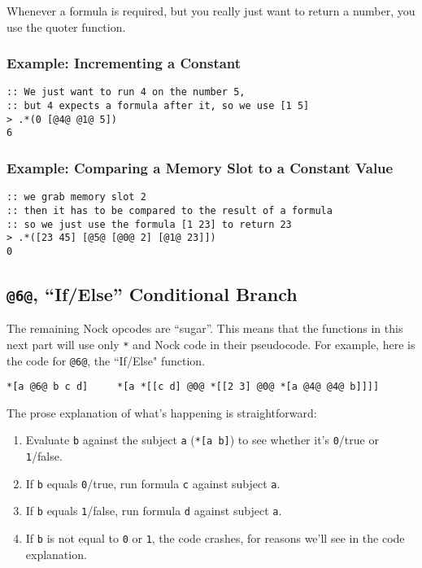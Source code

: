 \documentclass[twoside]{article}
\begin{document}
Whenever a formula is required, but you really just want to return a number, you use the quoter function.

\subsubsection{Example: Incrementing a Constant}

\begin{lstlisting}[style=listingcode]
:: We just want to run 4 on the number 5,
:: but 4 expects a formula after it, so we use [1 5]
> .*(0 [@4@ @1@ 5])
6
\end{lstlisting}

\subsubsection{Example: Comparing a Memory Slot to a Constant Value}

\begin{lstlisting}[style=listingcode]
:: we grab memory slot 2
:: then it has to be compared to the result of a formula
:: so we just use the formula [1 23] to return 23
> .*([23 45] [@5@ [@0@ 2] [@1@ 23]])
0
\end{lstlisting}

\subsection{\lstinline[style=inlinecode]{@6@}, “If/Else” Conditional Branch}

The remaining Nock opcodes are ``sugar''.  This means that the functions in this next part will use only \lstinline[style=inlinecode]{*} and Nock code in their pseudocode. For example, here is the code for \lstinline[style=inlinecode]{@6@}, the ``If/Else" function.

\begin{lstlisting}[style=listingcode]
*[a @6@ b c d]     *[a *[[c d] @0@ *[[2 3] @0@ *[a @4@ @4@ b]]]]
\end{lstlisting}

The prose explanation of what's happening is straightforward:

\begin{enumerate}
  \item  Evaluate \lstinline[style=inlinecode]{b} against the subject \lstinline[style=inlinecode]{a} (\lstinline[style=inlinecode]{*[a b]}) to see whether it's \lstinline[style=inlinecode]{0}/true or \lstinline[style=inlinecode]{1}/false.
  \item  If \lstinline[style=inlinecode]{b} equals \lstinline[style=inlinecode]{0}/true, run formula \lstinline[style=inlinecode]{c} against subject \lstinline[style=inlinecode]{a}.
  \item  If \lstinline[style=inlinecode]{b} equals \lstinline[style=inlinecode]{1}/false, run formula \lstinline[style=inlinecode]{d} against subject \lstinline[style=inlinecode]{a}.
  \item  If \lstinline[style=inlinecode]{b} is not equal to \lstinline[style=inlinecode]{0} or \lstinline[style=inlinecode]{1}, the code crashes, for reasons we'll see in the code explanation.
\end{enumerate}
\end{document}
